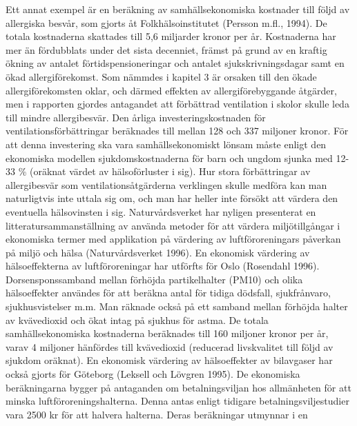 Ett annat exempel är en beräkning av samhällsekonomiska kostnader till följd av allergiska besvår, som gjorts åt Folkhälsoinstitutet (Persson m.fl., 1994). De totala kostnaderna skattades till 5,6 miljarder kronor per år. Kostnaderna har mer än fördubblats under det sista decenniet, främst på grund av en kraftig ökning av antalet förtidspensioneringar och antalet sjukskrivningsdagar samt en ökad allergiförekomst. Som nämmdes i kapitel 3 är orsaken till den ökade allergiförekomsten oklar, och därmed effekten av allergiförebyggande åtgärder, men i rapporten gjordes antagandet att förbättrad ventilation i skolor skulle leda till mindre allergibesvär. Den årliga investeringskostnaden för ventilationsförbättringar beräknades till mellan 128 och 337 miljoner kronor. För att denna investering ska vara samhällsekonomiskt lönsam måste enligt den ekonomiska modellen sjukdomskostnaderna för barn och ungdom sjunka med 12-33 \% (oräknat värdet av hälsoförluster i sig). Hur stora förbättringar av allergibesvär som ventilationsåtgärderna verklingen skulle medföra kan man naturligtvis inte uttala sig om, och man har heller inte försökt att värdera den eventuella hälsovinsten i sig.
Naturvårdsverket har nyligen presenterat en litteratursammanställning av använda metoder för att värdera miljötillgångar i ekonomiska termer med applikation på värdering av luftföroreningars påverkan på miljö och hälsa (Naturvårdsverket 1996).
En ekonomisk värdering av hälsoeffekterna av luftföroreningar har utförfts för Oslo (Rosendahl 1996). Dorsensponssamband mellan förhöjda partikelhalter (PM10) och olika hälsoeffekter användes för att beräkna antal för tidiga dödsfall, sjukfrånvaro, sjukhusvistelser m.m. Man räknade också på ett samband mellan förhöjda halter av kvävedioxid och ökat intag på sjukhus för astma. De totala samhällsekonomiska kostnaderna beräknades till 160 miljoner kronor per år, varav 4 miljoner hänfördes till kvävedioxid (reducerad livskvalitet till följd av sjukdom oräknat).
En ekonomisk värdering av hälsoeffekter av bilavgaser har också gjorts för Göteborg (Leksell och Lövgren 1995). De ekonomiska beräkningarna bygger på antaganden om betalningsviljan hos allmänheten för att minska luftföroreningshalterna. Denna antas enligt tidigare betalningsviljestudier vara 2500 kr för att halvera halterna. Deras beräkningar utmynnar i en

